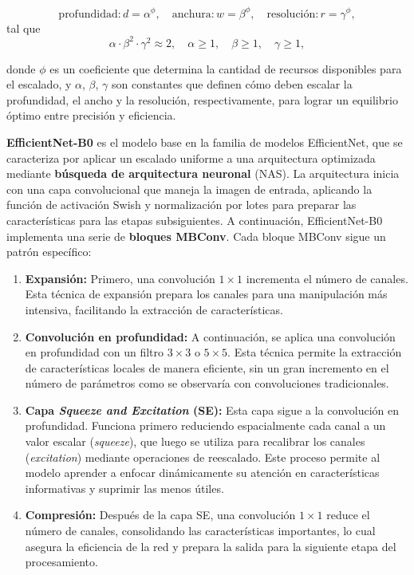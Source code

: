 \begin{equation}
	\text{profundidad}: d = \alpha^\phi, \quad \text{anchura}: w = \beta^\phi, \quad \text{resolución}: r = \gamma^\phi,
\end{equation}
tal que 
\[
\alpha \cdot \beta^2 \cdot \gamma^2 \approx 2, \quad \alpha \geq 1, \quad \beta \geq 1, \quad \gamma \geq 1,
\]

donde \(\phi\) es un coeficiente que determina la cantidad de recursos disponibles para el escalado, y \(\alpha\), \(\beta\), \(\gamma\) son constantes que definen cómo deben escalar la profundidad, el ancho y la resolución, respectivamente, para lograr un equilibrio óptimo entre precisión y eficiencia.

\textbf{EfficientNet-B0} es el modelo base en la familia de modelos EfficientNet, que se caracteriza por aplicar un escalado uniforme a una arquitectura optimizada mediante \textbf{búsqueda de arquitectura neuronal} (NAS). La arquitectura inicia con una capa convolucional que maneja la imagen de entrada, aplicando la función de activación Swish y normalización por lotes para preparar las características para las etapas subsiguientes. A continuación, EfficientNet-B0 implementa una serie de \textbf{bloques MBConv}. Cada bloque MBConv sigue un patrón específico:

\begin{enumerate}
	\item \textbf{Expansión:} Primero, una convolución \(1 \times 1\) incrementa el número de canales. Esta técnica de expansión prepara los canales para una manipulación más intensiva, facilitando la extracción de características.
	
	\item \textbf{Convolución en profundidad:} A continuación, se aplica una convolución en profundidad con un filtro \(3 \times 3\) o \(5 \times 5\). Esta técnica permite la extracción de características locales de manera eficiente, sin un gran incremento en el número de parámetros como se observaría con convoluciones tradicionales.
	
	\item \textbf{Capa \textit{Squeeze and Excitation} (SE):} Esta capa sigue a la convolución en profundidad. Funciona primero reduciendo espacialmente cada canal a un valor escalar (\textit{squeeze}), que luego se utiliza para recalibrar los canales (\textit{excitation}) mediante operaciones de reescalado. Este proceso permite al modelo aprender a enfocar dinámicamente su atención en características informativas y suprimir las menos útiles.
	
	\item \textbf{Compresión:} Después de la capa SE, una convolución \(1 \times 1\) reduce el número de canales, consolidando las características importantes, lo cual asegura la eficiencia de la red y prepara la salida para la siguiente etapa del procesamiento.
\end{enumerate}

